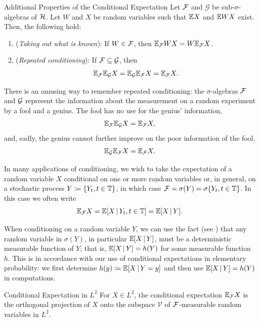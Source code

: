 \begin{thm}{Additional Properties of the Conditional Expectation}{}
Let $\mathcal{F}$ and $\mathcal{G}$ be sub-$\sigma$-algebras of $\mathcal{H}$. Let $W$ and $X$ be random variables such that $\mathbb{E} X$ and $\mathbb{E} WX$ exist. Then, the following hold:
\begin{enumerate}
    \item (\textit{Taking out what is known}): If $W \in \mathcal{F}$, then $\mathbb{E}_{\mathcal{F}} WX = W \mathbb{E}_{\mathcal{F}} X$.
    \item (\textit{Repeated conditioning}): If $\mathcal{F} \subseteq \mathcal{G}$, then
    \begin{equation}
        \mathbb{E}_{\mathcal{F}} \mathbb{E}_{\mathcal{G}} X = \mathbb{E}_{\mathcal{G}} \mathbb{E}_{\mathcal{F}} X = \mathbb{E}_{\mathcal{F}} X.
        \label{eq:TowerProperty}
    \end{equation}
\end{enumerate}
\end{thm}

There is an amusing way to remember repeated conditioning: the $\sigma$-algebras $\mathcal{F}$ and $\mathcal{G}$ represent the information about the measurement on a random experiment by a fool and a genius. The fool has no use for the genius' information,
\[
    \mathbb{E}_{\mathcal{F}}\mathbb{E}_{\mathcal{G}} X = \mathbb{E}_{\mathcal{F}} X,
\]
and, sadly, the genius cannot further improve on the poor information of the fool,
\[
    \mathbb{E}_{\mathcal{G}}\mathbb{E}_{\mathcal{F}} X = \mathbb{E}_{\mathcal{F}} X.
\]

In many applications of conditioning, we wish to take the expectation of a random variable $X$ conditional on one or more random variables or, in general, on a stochastic process $Y \coloneqq \{Y_t, t \in \mathbb{T}\}$, in which case $\mathcal{F} = \sigma(Y) = \sigma\{Y_t, t \in \mathbb{T}\}$. In this case we often write
\[
    \mathbb{E}_{\mathcal{F}} X = \mathbb{E}[X \,\vert\, Y_t, t \in \mathbb{T}] = \mathbb{E}[X \,\vert\, Y].
\]

When conditioning on a random variable $Y$, we can use the fact (see ) that any random variable in $\sigma(Y)$, in particular $\mathbb{E}[X \,\vert\, Y]$, must be a deterministic measurable function of $Y$; that is, $\mathbb{E}[X \,\vert\, Y] = h(Y)$ for some measurable function $h$. This is in accordance with our use of conditional expectations in elementary probability: we first determine $h(y) \coloneqq \mathbb{E}[X \,\vert\, Y = y]$ and then use $\mathbb{E}[X \,\vert\, Y] = h(Y)$ in computations.


\begin{thm}{Conditional Expectation in $L^2$}{}
For $X \in L^2$, the conditional expectation $\mathbb{E}_{\mathcal{F}} X$ is the orthogonal projection of $X$ onto the subspace $\mathcal{V}$ of $\mathcal{F}$-measurable random variables in $L^2$.
\end{thm}

